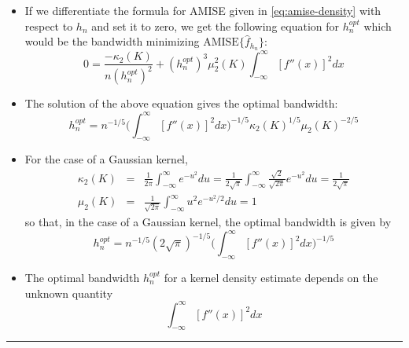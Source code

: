 \documentclass[]{book}
\begin{document}
\begin{itemize}
\item
  If we differentiate the formula for AMISE given in \eqref{eq:amise-density} with respect to \(h_{n}\) and set it to zero,
  we get the following equation for \(h_{n}^{opt}\) which would be the bandwidth minimizing \(\textrm{AMISE}\{ \hat{f}_{h_{n}} \}\):
  \begin{equation}
  0 = \frac{-\kappa_{2}(K) }{n (h_{n}^{opt})^{2} } + (h_{n}^{opt})^{3}\mu_{2}^{2}(K) \int_{-\infty}^{\infty} [f''(x)]^{2} dx \nonumber
  \end{equation}
\item
  The solution of the above equation gives the optimal bandwidth:
  \begin{equation}
  h_{n}^{opt} = n^{-1/5} \Big( \int_{-\infty}^{\infty} [f''(x)]^{2} dx \Big)^{-1/5}\kappa_{2}(K)^{1/5} \mu_{2}(K)^{-2/5} \nonumber
  \end{equation}
\item
  For the case of a Gaussian kernel,
  \begin{eqnarray}
  \kappa_{2}(K) &=& \frac{1}{2\pi}\int_{-\infty}^{\infty} e^{-u^{2}} du = \frac{1}{2\sqrt{\pi}}\int_{-\infty}^{\infty} \frac{\sqrt{2}}{\sqrt{2\pi}} e^{-u^{2}} du = \frac{1}{2\sqrt{\pi}} \nonumber \\
  \mu_{2}(K) &=& \frac{1}{\sqrt{2\pi}}\int_{-\infty}^{\infty} u^{2}e^{-u^{2}/2} du = 1
  \end{eqnarray}
  so that, in the case of a Gaussian kernel, the optimal bandwidth is given by
  \begin{equation}
  h_{n}^{opt} = n^{-1/5} (2\sqrt{\pi})^{-1/5} \Big( \int_{-\infty}^{\infty} [f''(x)]^{2} dx \Big)^{-1/5}
  \end{equation}
\item
  The optimal bandwidth \(h_{n}^{opt}\) for a kernel density estimate depends on the unknown quantity
  \begin{equation}
  \int_{-\infty}^{\infty} [f''(x)]^{2} dx  \nonumber
  \end{equation}
\end{itemize}

\begin{center}\rule{0.5\linewidth}{\linethickness}\end{center}
\end{document}
